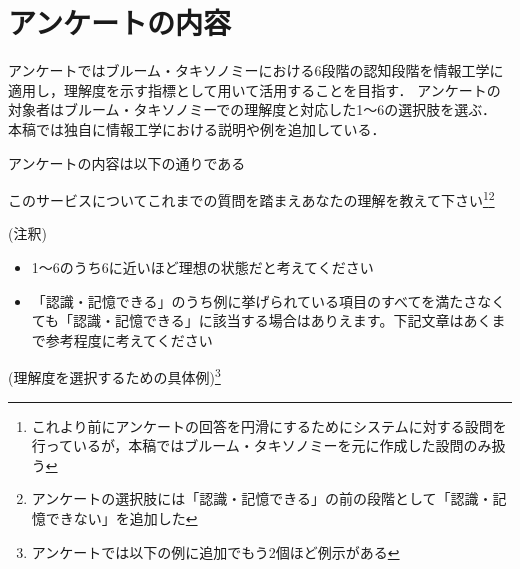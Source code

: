 \section{アンケートの内容}
アンケートではブルーム・タキソノミーにおける6段階の認知段階を情報工学に適用し，理解度を示す指標として用いて活用することを目指す．
アンケートの対象者はブルーム・タキソノミーでの理解度と対応した1～6の選択肢を選ぶ．
本稿では独自に情報工学における説明や例を追加している．

アンケートの内容は以下の通りである\newline

このサービスについてこれまでの質問を踏まえあなたの理解を教えて下さい\footnote{これより前にアンケートの回答を円滑にするためにシステムに対する設問を行っているが，本稿ではブルーム・タキソノミーを元に作成した設問のみ扱う}\footnote{アンケートの選択肢には「認識・記憶できる」の前の段階として「認識・記憶できない」を追加した}\newline

(注釈)
\begin{itemize}
    \item 1～6のうち6に近いほど理想の状態だと考えてください
    \item 「認識・記憶できる」のうち例に挙げられている項目のすべてを満たさなくても「認識・記憶できる」に該当する場合はありえます。下記文章はあくまで参考程度に考えてください
\end{itemize}
(理解度を選択するための具体例)\footnote{アンケートでは以下の例に追加でもう2個ほど例示がある}

\renewcommand{\arraystretch}{1.5} %
\scriptsize

